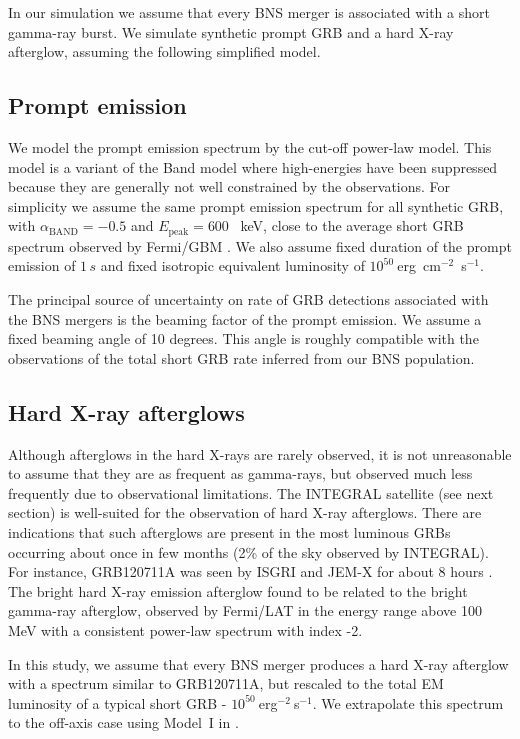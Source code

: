 \documentclass[11pt]{article}
\begin{document}
In our simulation we assume that every BNS merger is associated with a short
gamma-ray burst. We simulate synthetic prompt GRB and a hard X-ray afterglow,
assuming the following simplified model.

\subsection*{Prompt emission}

We model the prompt emission spectrum by the cut-off power-law model. This model
is a variant of the Band model \citep{1993ApJ...413..281B} where high-energies
have been suppressed because they are generally not well constrained by the
observations. For simplicity we assume the same prompt emission spectrum for all
synthetic GRB, with $\alpha_{\mathrm{BAND}} = - 0.5$ and $E_{\mathrm{peak}} =
600$ \, keV, close to the average short GRB spectrum observed by Fermi/GBM
\citep{2014ApJS..211...12G}. We also assume fixed duration of the prompt
emission of $1 \, s$ and fixed isotropic equivalent luminosity of
$10^{50}~$erg~cm$^{-2}$~s$^{-1}$.

The principal source of uncertainty on rate of GRB detections associated with
the BNS mergers is the beaming factor of the prompt emission. We assume a fixed
beaming angle of 10 degrees. This angle is roughly compatible with the observations
of the total short GRB rate inferred from our BNS population.

\subsection*{Hard X-ray afterglows}

Although afterglows in the hard X-rays are rarely observed, it is not
unreasonable to assume that they are as frequent as gamma-rays, but observed
much less frequently due to observational limitations. The INTEGRAL satellite
(see next section) is well-suited for the observation of hard X-ray
afterglows. There are indications that such afterglows are present in the most
luminous GRBs occurring about once in few months (2\% of the sky observed by
INTEGRAL). For instance, GRB120711A was seen by ISGRI and JEM-X for about 8
hours \citep{2014A&A...567A..84M}. The bright hard X-ray emission afterglow
found to be related to the bright gamma-ray afterglow, observed by Fermi/LAT in
the energy range above 100 MeV with a consistent power-law spectrum with index
-2.

In this study, we assume that every BNS merger produces a hard X-ray afterglow
with a spectrum similar to GRB120711A, but rescaled to the total EM
luminosity of a typical short GRB - $10^{50}~$erg$^{-2}~$s$^{-1}$. We extrapolate
this spectrum to the off-axis case using Model~I in \citep{2016arXiv160606124P}.
\end{document}

